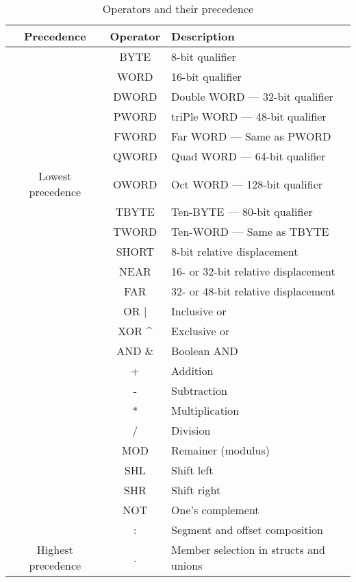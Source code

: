 \documentclass[a4paper,12pt]{book}
\begin{document}
\begin{table}[h]
\begin{center}
\begin{tabular}[h]{ccl}
\hline
Precedence & Operator & Description\\
\hline
                   & BYTE & 8-bit qualifier\\
                   & WORD & 16-bit qualifier\\
                   & DWORD & Double WORD --- 32-bit qualifier\\
                   & PWORD & triPle WORD --- 48-bit qualifier\\
                   & FWORD & Far WORD --- Same as PWORD\\
                   & QWORD & Quad WORD --- 64-bit qualifier\\
Lowest precedence  & OWORD & Oct WORD --- 128-bit qualifier\\
                   & TBYTE & Ten-BYTE --- 80-bit qualifier\\
                   & TWORD & Ten-WORD --- Same as TBYTE\protect{\footnotemark}\\
                   & SHORT & 8-bit relative displacement\\
                   & NEAR & 16- or 32-bit relative displacement\\
                   & FAR & 32- or 48-bit relative displacement\\
\hline
                   & OR $\vert$ & Inclusive or\\
                   & XOR \^{} & Exclusive or\\
\hline
                   & AND \& & Boolean AND\\
\hline
                   & + & Addition\\
                   & - & Subtraction\\
\hline
                   & * & Multiplication\\
                   & / & Division\\
                   & MOD & Remainer (modulus)\\
                   & SHL & Shift left\\
                   & SHR & Shift right\\
\hline
                   & NOT & One's complement\\
\hline
                   & : & Segment and offset composition\\
\hline
Highest precedence & . & Member selection in structs and unions\\
\hline
\end{tabular}
\caption{Operators and their precedence}
\label{OPTAB}
\end{center}
\end{table}
\end{document}
